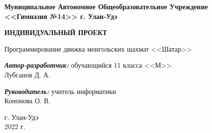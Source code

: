 \begin{titlepage}
	\begin{center}
		{\bf 
			Муниципальное Автономное Общеобразовательное Учреждение \\
			<<Гимназия №14>> г. Улан-Удэ
		}
		
		\vspace{4em}
		{\bf
			ИНДИВИДУАЛЬНЫЙ ПРОЕКТ
		}
		\vspace{6em}
		
		Программирование движка монгольских шахмат <<Шатар>>
		
	\end{center}
	\vspace{8em}
	\begin{flushright}
		
		\textbf{\textit{Автор-разработчик:}}
		обучающийся 11 класса <<М>> \\
		Лубсанов Д. А.
		
		\vspace{2em}
		
		\textbf{\textit{Руководитель:}}
		учитель информатики \\
		Кононова О. В.
		
	\end{flushright}
	
	\vspace{14em}
	
	\begin{center}
		г. Улан-Удэ \\
		2022 г.
	\end{center}
	
	\clearpage
\end{titlepage}